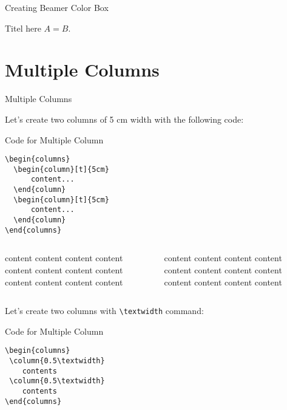 \documentclass[10pt,xcolor=x11names]{beamer}
\begin{document}
\begin{frame}{Creating Beamer Color Box}
\vspace{10pt}

\begin{beamerboxesrounded}[upper=upper,lower=lower,shadow=true]
{Titel here}
	$A = B$.
\end{beamerboxesrounded}

\end{frame}

\section{Multiple Columns}
\begin{frame}{Multiple Columns} 

\begin{center}
Let's create two columns of 5 cm width with the following code:
\end{center} \vspace{-5pt}
\begin{block}{Code for Multiple Column }
\begin{verbatim}
\begin{columns}
  \begin{column}[t]{5cm}
      content...
  \end{column}
  \begin{column}[t]{5cm}
      content...
  \end{column}	
\end{columns}
	\end{verbatim}
\end{block}

\begin{columns}
\begin{column}[t]{5cm}
content content content content content content content content content content content content 
\end{column}
\begin{column}[t]{5cm}
content content content content content content content content content content content content 
\end{column}
\end{columns}

\begin{center}
	Let's create two columns with \verb|\textwidth| command:
\end{center} \vspace{-5pt}

\begin{block}{Code for Multiple Column }
	\begin{verbatim}
\begin{columns}
 \column{0.5\textwidth}
    contents
 \column{0.5\textwidth}
    contents
\end{columns}
	\end{verbatim}
\end{block}


\end{frame}
\end{document}
